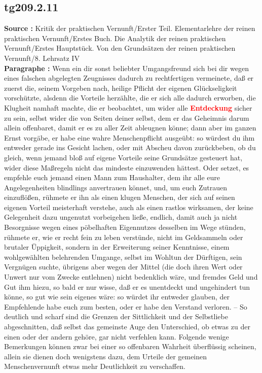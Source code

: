 \documentclass[a4paper,12pt,twoside]{book}
\newcommand{\match}[1]{\textcolor{red}{\textbf{#1}}}
\begin{document}
	\subsection*{tg209.2.11} 
	\textbf{Source : }Kritik der praktischen Vernunft/Erster Teil. Elementarlehre der reinen praktischen Vernunft/Erstes Buch. Die Analytik der reinen praktischen Vernunft/Erstes Hauptstück. Von den Grundsätzen der reinen praktischen Vernunft/8. Lehrsatz IV\\  
	
	\noindent\textbf{Paragraphe : }Wenn ein dir sonst beliebter Umgangsfreund sich bei dir wegen eines falschen abgelegten Zeugnisses dadurch zu rechtfertigen vermeinete, daß er zuerst die, seinem Vorgeben nach, heilige Pflicht der eigenen Glückseligkeit vorschützte, alsdenn die Vorteile herzählte, die er sich alle dadurch erworben, die Klugheit namhaft machte, die er beobachtet, um wider alle \match{Entdeckung} sicher zu sein, selbst wider die von Seiten deiner selbst, dem er das Geheimnis darum allein offenbaret, damit er es zu aller Zeit ableugnen könne; dann aber im ganzen Ernst vorgäbe, er habe eine wahre Menschenpflicht ausgeübt: so würdest du ihm entweder gerade ins Gesicht lachen, oder mit Abscheu davon zurückbeben, ob du gleich, wenn jemand bloß auf eigene Vorteile seine Grundsätze gesteuert hat, wider diese Maßregeln nicht das mindeste einzuwenden hättest. Oder setzet, es empfehle euch jemand einen Mann zum Haushalter, dem ihr alle eure Angelegenheiten blindlings anvertrauen könnet, und, um euch Zutrauen einzuflößen, rühmete er ihn als einen klugen Menschen, der sich auf seinen eigenen Vorteil meisterhaft verstehe, auch als einen rastlos wirksamen, der keine Gelegenheit dazu ungenutzt vorbeigehen ließe, endlich, damit auch ja nicht Besorgnisse wegen eines pöbelhaften Eigennutzes desselben im Wege stünden, rühmete er, wie er recht fein zu leben verstünde, nicht im Geldsammeln oder brutaler Üppigkeit, sondern in der Erweiterung seiner Kenntnisse, einem wohlgewählten belehrenden Umgange, selbst im Wohltun der Dürftigen, sein Vergnügen suchte, übrigens aber wegen der Mittel (die doch ihren Wert oder Unwert nur vom Zwecke entlehnen) nicht bedenklich wäre, und fremdes Geld und Gut ihm hiezu, so bald er nur wisse,  daß er es unentdeckt und ungehindert tun könne, so gut wie sein eigenes wäre: so würdet ihr entweder glauben, der Empfehlende habe euch zum besten, oder er habe den Verstand verloren. – So deutlich und scharf sind die Grenzen der Sittlichkeit und der Selbstliebe abgeschnitten, daß selbst das gemeinste Auge den Unterschied, ob etwas zu der einen oder der andern gehöre, gar nicht verfehlen kann. Folgende wenige Bemerkungen können zwar bei einer so offenbaren Wahrheit überflüssig scheinen, allein sie dienen doch wenigstens dazu, dem Urteile der gemeinen Menschenvernunft etwas mehr Deutlichkeit zu verschaffen. 
	
\end{document}
